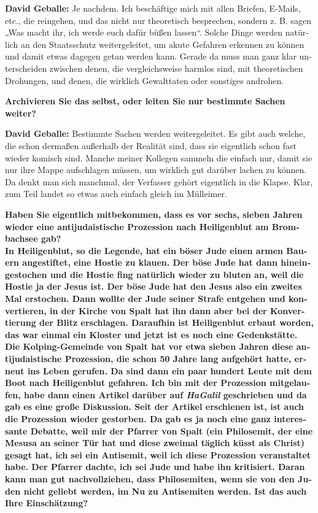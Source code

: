 \begin{otherlanguage}{ngerman}
\textbf{David Geballe:} Je nachdem. Ich beschäftige mich mit allen Briefen, E-Mails, etc., die reingehen, und das nicht nur theoretisch besprechen, sondern z. B. sagen „Was macht ihr, ich werde euch dafür büßen lassen“. Solche Dinge werden natürlich an den Staatsschutz weitergeleitet, um akute Gefahren erkennen zu können und damit etwas dagegen getan werden kann. Gerade da muss man ganz klar unterscheiden zwischen denen, die vergleichsweise harmlos sind, mit theoretischen Drohungen, und denen, die wirklich Gewalttaten oder sonstiges androhen. 

\textbf{Archivieren Sie das selbst, oder leiten Sie nur bestimmte Sachen weiter?} 

\textbf{David Geballe:} Bestimmte Sachen werden weitergeleitet. Es gibt auch welche, die schon dermaßen außerhalb der Realität sind, dass sie eigentlich schon fast wieder komisch sind. Manche meiner Kollegen sammeln die einfach nur, damit sie nur ihre Mappe aufschlagen müssen, um wirklich gut darüber lachen zu können. Da denkt man sich manchmal, der Verfasser gehört eigentlich in die Klapse. Klar, zum Teil landet so etwas auch einfach gleich im Mülleimer. 

\textbf{Haben Sie eigentlich mitbekommen, dass es vor sechs, sieben Jahren wieder eine antijudaistische Prozession nach Heiligenblut am Brombachsee gab? \\
In Heiligenblut, so die Legende, hat ein böser Jude einen armen Bauern angestiftet, eine Hostie zu klauen. Der böse Jude hat dann hineingestochen und die Hostie fing natürlich wieder zu bluten an, weil die Hostie ja der Jesus ist. Der böse Jude hat den Jesus also ein zweites Mal erstochen. Dann wollte der Jude seiner Strafe entgehen und konvertieren, in der Kirche von Spalt hat ihn dann aber bei der Konvertierung der Blitz erschlagen. Daraufhin ist Heiligenblut erbaut worden, das war einmal ein Kloster und jetzt ist es noch eine Gedenkstätte. Die Kolping-Gemeinde von Spalt hat vor etwa sieben Jahren diese antijudaistische Prozession, die schon 50 Jahre lang aufgehört hatte, erneut ins Leben gerufen. Da sind dann ein paar hundert Leute mit dem Boot nach Heiligenblut gefahren. Ich bin mit der Prozession mitgelaufen, habe dann einen Artikel darüber auf \textit{HaGalil} geschrieben und da gab es eine große Diskussion. Seit der Artikel erschienen ist, ist auch die Prozession wieder gestorben. Da gab es ja noch eine ganz interessante Debatte, weil mir der Pfarrer von Spalt (ein Philosemit, der eine Mesusa an seiner Tür hat und diese zweimal täglich küsst als Christ) gesagt hat, ich sei ein Antisemit, weil ich diese Prozession veranstaltet habe. Der Pfarrer dachte, ich sei Jude und habe ihn kritisiert. Daran kann man gut nachvollziehen, dass Philosemiten, wenn sie von den Juden nicht geliebt werden, im Nu zu Antisemiten werden. Ist das auch Ihre Einschätzung?}  


\end{otherlanguage}
